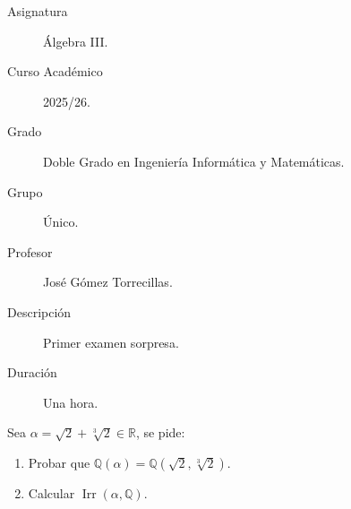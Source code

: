\documentclass[12pt]{article}
\DeclareMathOperator{\Irr}{Irr}
\begin{document}

    
    

    \begin{description}
        \item[Asignatura] Álgebra III.
        \item[Curso Académico] 2025/26.
        \item[Grado] Doble Grado en Ingeniería Informática y Matemáticas.
        \item[Grupo] Único.
        \item[Profesor] José Gómez Torrecillas.
        \item[Descripción] Primer examen sorpresa.
        \item[Duración] Una hora.
    
    \end{description}
    \newpage



\begin{ejercicio}
    Sea $\alpha = \sqrt{2}+\sqrt[3]{2}\in \mathbb{R}$, se pide:
    \begin{enumerate}[label=\alph*)]
        \item Probar que $\mathbb{Q}(\alpha) = \mathbb{Q}(\sqrt{2},\sqrt[3]{2})$.
        \item Calcular $\Irr(\alpha,\mathbb{Q})$.
    \end{enumerate}
\end{ejercicio}
\newpage
\setcounter{ejercicio}{0}
\end{document}
